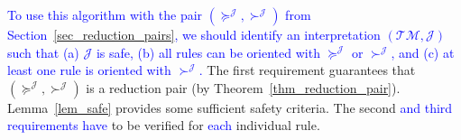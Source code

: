 \documentclass[a4paper,UKenglish,cleveref,autoref,numberwithinsect]{lipics-v2019}
\theoremstyle{definition}
\newcommand{\Rules}{\mathcal{R}}
\newcommand{\Typemap}{\mathcal{T\!M}}
\newcommand{\Termmap}{\mathcal{J}}
\newcommand{\succinterpret}{\succ^{\Termmap}}
\newcommand{\succeqinterpret}{\succeq^{\Termmap}}
\newcommand{\CKchange}[1]{\textcolor{blue}{#1}}
\begin{document}
\medskip
\CKchange{To use this algorithm with the pair $(\succeqinterpret,\succinterpret)$
from Section~\ref{sec_reduction_pairs}, we should identify an
interpretation $(\Typemap,\Termmap)$
such that (a) $\Termmap$ is safe, (b) all rules can be oriented with
$\succeqinterpret$ or $\succinterpret$, and (c) at least one rule is
oriented with $\succinterpret$.}
%
The first requirement guarantees that
$(\succeqinterpret,\succinterpret)$ is a reduction pair (by
Theorem~\ref{thm_reduction_pair}). Lemma~\ref{lem_safe} provides some
sufficient safety criteria. The second \CKchange{and third
requirements have} to be verified for \CKchange{each} individual rule.
\end{document}
